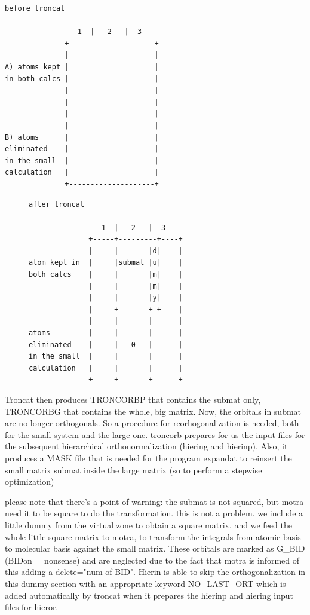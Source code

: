 \documentclass[a4paper,11pt]{report}
\begin{document}
\begin{verbatim}
before troncat

                 1  |   2   |  3
              +--------------------+
              |                    |
A) atoms kept |                    |
in both calcs |                    |
              |                    |
              |                    |
        ----- |                    |
              |                    |
B) atoms      |                    |
eliminated    |                    |
in the small  |                    |
calculation   |                    |
              +--------------------+
\end{verbatim}

\begin{figure}[ht]
\begin{verbatim}
after troncat

                 1  |   2   |  3
              +-----+---------+----+
              |     |       |d|    |
atom kept in  |     |submat |u|    |
both calcs    |     |       |m|    |
              |     |       |m|    |
              |     |       |y|    |
        ----- |     +-------+-+    |
              |     |       |      |
atoms         |     |       |      |
eliminated    |     |   0   |      |
in the small  |     |       |      |
calculation   |     |       |      |
              +-----+-------+------+
\end{verbatim}
\end{figure}

Troncat then produces TRONCORBP that contains the submat only, TRONCORBG
that contains the whole, big matrix.
Now, the orbitals in submat are no longer orthogonals. So a procedure for
reorhogonalization is needed, both for the small system and the large
one. troncorb prepares for us the input files for the subsequent
hierarchical orthonormalization (hiering and hierinp). Also, it produces
a MASK file that is needed for the program expandat to reinsert the small
matrix submat inside the large matrix (so to perform a stepwise
optimization)

please note that there's a point of warning: the submat is not squared, but
motra need it to be square to do the transformation. this is not a problem.
we include a little dummy from the virtual zone to obtain a square
matrix, and we feed the whole little square matrix to motra, to transform the
integrals from atomic basis to molecular basis against the small matrix.
These orbitals are marked as G\_BID (BIDon = nonsense) and are neglected due
to the fact that motra is informed of this adding a delete="num of BID".
Hierin is able to skip the orthogonalization in this dummy section with an
appropriate keyword NO\_LAST\_ORT which is added automatically by troncat
when it prepares the hierinp and hiering input files for hieror.
\end{document}
